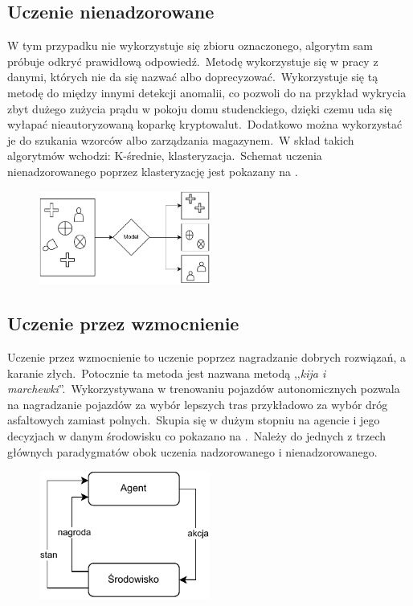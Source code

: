 \subsection{Uczenie nienadzorowane}
W tym przypadku nie wykorzystuje się zbioru oznaczonego, algorytm sam próbuje odkryć prawidłową odpowiedź.\ Metodę wykorzystuje się w pracy z danymi, których nie da się nazwać albo doprecyzować.\ Wykorzystuje się tą metodę do między innymi detekcji anomalii, co pozwoli do na przykład wykrycia zbyt dużego zużycia prądu w pokoju domu studenckiego, dzięki czemu uda się wyłapać nieautoryzowaną koparkę kryptowalut.\ Dodatkowo można wykorzystać je do szukania wzorców albo zarządzania magazynem.\ W skład takich algorytmów wchodzi: K-średnie, klasteryzacja.\ Schemat uczenia nienadzorowanego poprzez klasteryzację jest pokazany na .

\begin{figure}[H]
    \centering
    \includegraphics[width=0.5\textwidth]{images/unsupervised}
    \label{fig:unspervised}
\end{figure}

\subsection{Uczenie przez wzmocnienie}
Uczenie przez wzmocnienie to uczenie poprzez nagradzanie dobrych rozwiązań, a karanie złych.\ Potocznie ta metoda jest nazwana metodą ,,\textit{kija i marchewki}''.\ Wykorzystywana w trenowaniu pojazdów autonomicznych pozwala na nagradzanie pojazdów za wybór lepszych tras przykładowo za wybór dróg asfaltowych zamiast polnych.\ Skupia się w dużym stopniu na agencie i jego decyzjach w danym środowisku co pokazano na .\ Należy do jednych z trzech głównych paradygmatów obok uczenia nadzorowanego i nienadzorowanego.

\begin{figure}[H]
    \centering
    \includegraphics[width=0.5\textwidth]{images/reinforcemen}
    \label{fig:reinforcemenet}
\end{figure}


